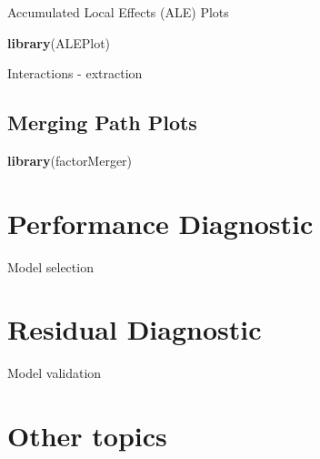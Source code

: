 \documentclass[]{book}
\newenvironment{Shaded}{\begin{snugshade}}{\end{snugshade}}
\newcommand{\KeywordTok}[1]{\textcolor[rgb]{0.13,0.29,0.53}{\textbf{#1}}}
\newcommand{\NormalTok}[1]{#1}
\theoremstyle{definition}
\theoremstyle{definition}
\theoremstyle{definition}
\theoremstyle{remark}
\begin{document}
Accumulated Local Effects (ALE) Plots

\citep{R-ALEPlot}

\begin{Shaded}
\begin{Highlighting}[]
\KeywordTok{library}\NormalTok{(ALEPlot)}
\end{Highlighting}
\end{Shaded}

Interactions - extraction

\hypertarget{merging-path-plots}{%
\section{Merging Path Plots}\label{merging-path-plots}}

\citep{R-factorMerger}

\begin{Shaded}
\begin{Highlighting}[]
\KeywordTok{library}\NormalTok{(factorMerger)}
\end{Highlighting}
\end{Shaded}

\hypertarget{performance-diagnostic}{%
\chapter{Performance Diagnostic}\label{performance-diagnostic}}

Model selection

\hypertarget{residual-diagnostic}{%
\chapter{Residual Diagnostic}\label{residual-diagnostic}}

Model validation

\hypertarget{other-topics}{%
\chapter{Other topics}\label{other-topics}}


\end{document}
